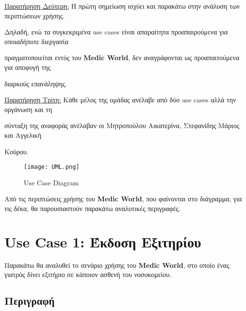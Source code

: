 \documentclass{article}
\begin{document}
\vspace{0.3cm}

\underline{Παρατήρηση Δεύτερη:} Η πρώτη σημείωση ισχύει και παρακάτω στην ανάλυση των περιπτώσεων χρήσης. \par \vspace{0.1cm} Δηλαδή, ενώ τα συγκεκριμένα use cases είναι απαραίτητα προαπαιρούμενα για οποιαδήποτε διεργασία \par πραγματοποιείται εντός του \textbf{Medic World}, δεν αναγράφονται ως προαπαιτούμενα για αποφυγή της \par διαρκούς επανάληψης.  

\vspace{0.3cm}

\underline{Παρατήρηση Τρίτη:} Κάθε μέλος της ομάδας ανέλαβε από δύο use cases αλλά την οργάνωση και τη \par \vspace{0.1cm} σύνταξη της αναφοράς ανέλαβαν οι Μητροπούλου Αικατερίνα, Στεφανίδης Μάριος και Αγγελική \par Κούρου.

\newpage

\begin{figure}[!htb]
        \centering
        \texttt{[image: UML.png]}
        \caption{\label{fig: UML} Use Case Diagram}
\end{figure}

\vspace{0.2cm}

Από τις περιπτώσεις χρήσης του \textbf{Medic World}, που φαίνονται στο διάγραμμα, για τις δέκα, θα παρουσιαστούν παρακάτω αναλυτικές περιγραφές.

\newpage

\section{Use Case 1: Έκδοση Εξιτηρίου}

Παρακάτω θα αναλυθεί το σενάριο χρήσης του \textbf{Medic World}, στο οποίο ένας γιατρός δίνει εξιτήριο σε κάποιον ασθενή του νοσοκομείου.

\subsection{Περιγραφή}
\end{document}
